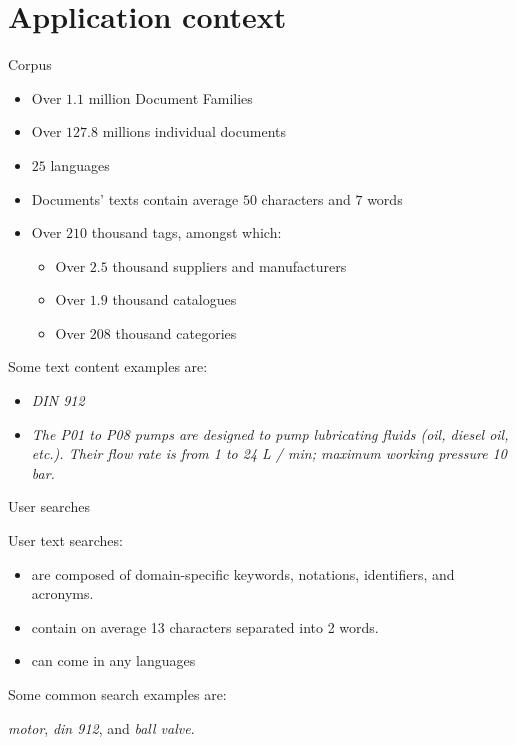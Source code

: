 \section{Application context}

\begin{frame}{Corpus}
    
    \begin{itemize}
        \item Over $1.1$ million Document Families
        \item Over $127.8$ millions individual documents
        \item $25$ languages
        \item Documents' texts contain average $50$ characters and $7$ words
        \item Over $210$ thousand tags, amongst which:
        \begin{itemize}
            \item Over $2.5$ thousand suppliers and manufacturers
            \item Over $1.9$ thousand catalogues
            \item Over $208$ thousand categories
        \end{itemize}
    \end{itemize}

    Some text content examples are:
    \begin{itemize}
        \item \emph{DIN 912}
        \item \emph{The P01 to P08 pumps are designed to pump lubricating fluids (oil, diesel oil, etc.). Their flow rate is from 1 to 24 L / min; maximum working pressure 10 bar.} 
    \end{itemize}

\end{frame}

\begin{frame}{User searches}
    
    User text searches:
    \begin{itemize}
        \item are composed of domain-specific keywords, notations, identifiers, and
        acronyms.
        \item contain on average 13 characters separated into 2 words.
        \item can come in any languages
    \end{itemize}

    Some common search examples are:
    \begin{center}
        \emph{motor}, \emph{din 912}, and \emph{ball valve}.
    \end{center}
    
\end{frame}


